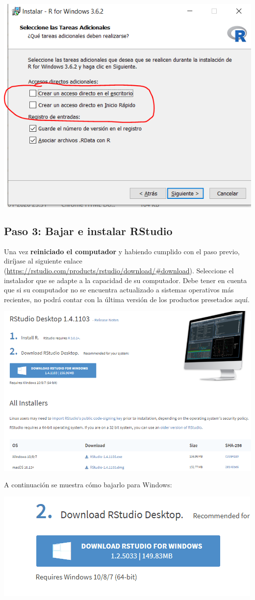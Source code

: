 \documentclass[
]{article}
\begin{document}
\begin{center}\includegraphics[width=0.6\linewidth]{./figs/Instalacion R- Win (8)} \end{center}

\hypertarget{paso-3-bajar-e-instalar-rstudio}{%
\subsection{Paso 3: Bajar e instalar
RStudio}\label{paso-3-bajar-e-instalar-rstudio}}

Una vez \textbf{reiniciado el computador} y habiendo cumplido con el
paso previo, diríjase al siguiente enlace
(\url{https://rstudio.com/products/rstudio/download/\#download}).
Seleccione el instalador que se adapte a la capacidad de su computador.
Debe tener en cuenta que si su computador no se encuentra actualizado a
sistemas operativos más recientes, no podrá contar con la última versión
de los productos presetados aquí.

\begin{center}\includegraphics[width=0.6\linewidth]{./figs/Instalacion R- Win (9)} \end{center}

A continuación se muestra cómo bajarlo para Windows:

\begin{center}\includegraphics{./figs/instalacion_Rstudio1} \end{center}
\end{document}
